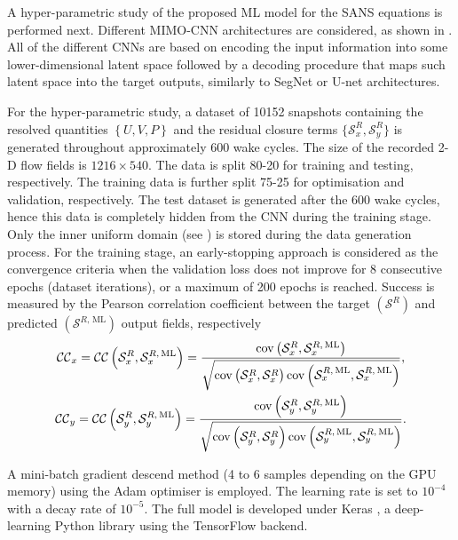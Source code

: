 \documentclass[../main.tex]{subfiles}
\begin{document}
A hyper-parametric study of the proposed ML model for the SANS equations is performed next.
Different MIMO-CNN architectures are considered, as shown in .
All of the different CNNs are based on encoding the input information into some lower-dimensional latent space followed by a decoding procedure that maps such latent space into the target outputs, similarly to SegNet \citep{Badrinarayanan2015} or U-net \citep{Ronneberger2015} architectures.

For the hyper-parametric study, a dataset of 10152 snapshots containing the resolved quantities $\left\lbrace U, V, P \right\rbrace$ and the residual closure terms $\lbrace \mathcal{S}^R_x,\mathcal{S}^R_y\rbrace$ is generated throughout approximately 600 wake cycles.
The size of the recorded 2-D flow fields is $1216\times540$.
The data is split 80-20 for training and testing, respectively.
The training data is further split 75-25 for optimisation and validation, respectively.
The test dataset is generated after the 600 wake cycles, hence this data is completely hidden from the CNN during the training stage.
Only the inner uniform domain (see ) is stored during the data generation process.
For the training stage, an early-stopping approach is considered as the convergence criteria when the validation loss does not improve for 8 consecutive epochs (dataset iterations), or a maximum of 200 epochs is reached.
Success is measured by the Pearson correlation coefficient between the target $({\mathcal{S}}^{R})$ and predicted $(\mathcal{S}^{R,\,\mathrm{ML}})$ output fields, respectively
\begin{gather}
\mathcal{CC}_x=\mathcal{CC}\left(\mathcal{S}^R_x,\mathcal{S}_x^{R,\,\mathrm{ML}} \right)=\frac{\mathrm{cov}\left(\mathcal{S}^R_x,\mathcal{S}_x^{R,\,\mathrm{ML}} \right)}{\sqrt{\mathrm{cov}\left(\mathcal{S}^R_x,\mathcal{S}^R_x \right)\mathrm{cov}\left(\mathcal{S}_x^{R,\,\mathrm{ML}},\mathcal{S}_x^{R,\,\mathrm{ML}} \right)}},\\
\mathcal{CC}_y=\mathcal{CC}\left(\mathcal{S}^R_y,\mathcal{S}_y^{R,\,\mathrm{ML}} \right)=\frac{\mathrm{cov}\left(\mathcal{S}^R_y,\mathcal{S}_y^{R,\,\mathrm{ML}} \right)}{\sqrt{\mathrm{cov}\left(\mathcal{S}^R_y,\mathcal{S}^R_y \right)\mathrm{cov}\left(\mathcal{S}_y^{R,\,\mathrm{ML}},\mathcal{S}_y^{R,\,\mathrm{ML}} \right)}}.
\end{gather}

A mini-batch gradient descend method (4 to 6 samples depending on the GPU memory) using the Adam optimiser \citep{Kingma2014} is employed.
The learning rate is set to $10^{-4}$ with a decay rate of $10^{-5}$.
The full model is developed under Keras \citep{Chollet2015}, a deep-learning Python library using the TensorFlow \citep{Tensorflow} backend.
\end{document}
